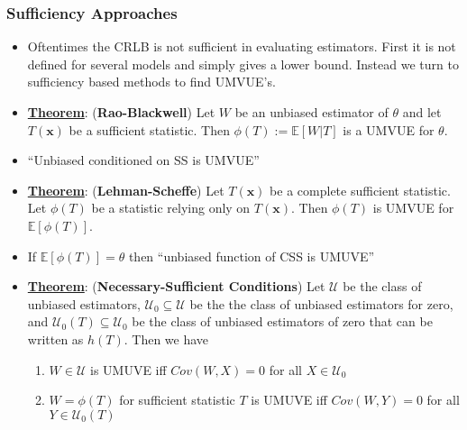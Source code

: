\documentclass{article}
\newcommand{\E}{{\mathbb{E}}}
\newcommand{\x}{{\textbf{x}}}
\begin{document}
\subsubsection{Sufficiency Approaches}
\begin{itemize}
\item Oftentimes the CRLB is not sufficient in evaluating estimators. First it is not defined for several models and simply gives a lower bound. Instead we turn to sufficiency based methods to find UMVUE's. 
\item \underline{\textbf{Theorem}}: (\textbf{Rao-Blackwell}) Let $W$ be an unbiased estimator of $\theta$ and let $T(\x)$ be a sufficient statistic. Then $\phi(T):= \E[W|T]$ is a UMVUE for $\theta$. 
\item ``Unbiased conditioned on SS is UMVUE''
\item \underline{\textbf{Theorem}}: (\textbf{Lehman-Scheffe}) Let $T(\x)$ be a complete sufficient statistic. Let $\phi(T)$ be a statistic relying only on $T(\x)$. Then $\phi(T)$ is UMVUE for $\E[\phi(T)]$. 
\item If $\E[\phi(T)] = \theta$ then ``unbiased function of CSS is UMUVE''
\item \underline{\textbf{Theorem}}: (\textbf{Necessary-Sufficient Conditions}) Let $\mathcal{U}$ be the class of unbiased estimators, $\mathcal{U}_0\subseteq \mathcal{U}$ be the the class of unbiased estimators for zero, and $\mathcal{U}_0(T)\subseteq\mathcal{U}_0$ be the class of unbiased estimators of zero that can be written as $h(T)$. Then we have 
\begin{enumerate}
\item $W\in\mathcal{U}$ is UMUVE iff $Cov(W,X) = 0$ for all $X\in\mathcal{U}_0$
\item $W = \phi(T)$ for sufficient statistic $T$ is UMUVE iff $Cov(W,Y) = 0$ for all $Y\in\mathcal{U}_0(T)$
\end{enumerate}
\end{itemize}
\end{document}
